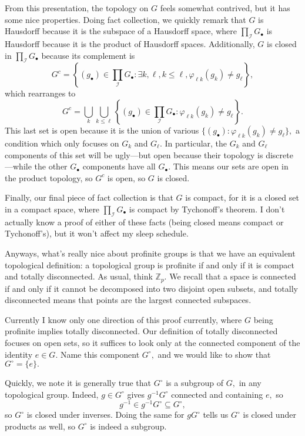 From this presentation, the topology on $G$ feels somewhat contrived, but it has some nice properties. Doing fact collection, we quickly remark that $G$ is Hausdorff because it is the subspace of a Hausdorff space, where $\prod_\mathcal IG_\bullet$ is Hausdorff because it is the product of Hausdorff spaces. Additionally, $G$ is closed in $\prod_\mathcal IG_\bullet$ because its complement is
\[G^c=\left\{(g_\bullet)\in\prod_\mathcal IG_\bullet:\exists k,\ell,k\le\ell,\varphi_{\ell k}(g_k)\ne g_\ell\right\},\]
which rearranges to
\[G^c=\bigcup_k\bigcup_{k\le\ell}\left\{(g_\bullet)\in\prod_\mathcal IG_\bullet:\varphi_{\ell k}(g_k)\ne g_\ell\right\}.\]
This last set is open because it is the union of various $\{(g_\bullet):\varphi_{\ell k}(g_k)\ne g_\ell\},$ a condition which only focuses on $G_k$ and $G_\ell.$ In particular, the $G_k$ and $G_\ell$ components of this set will be ugly---but open because their topology is discrete---while the other $G_\bullet$ components have all $G_\bullet.$ This means our sets are open in the product topology, so $G^c$ is open, so $G$ is closed.

Finally, our final piece of fact collection is that $G$ is compact, for it is a closed set in a compact space, where $\prod_\mathcal IG_\bullet$ is compact by Tychonoff's theorem. I don't actually know a proof of either of these facts (being closed means compact or Tychonoff's), but it won't affect my sleep schedule.

Anyways, what's really nice about profinite groups is that we have an equivalent topological definition: a topological group is profinite if and only if it is compact and totally disconnected. As usual, think $\mathbb Z_p.$ We recall that a space is connected if and only if it cannot be decomposed into two disjoint open subsets, and totally disconnected means that points are the largest connected subspaces.

Currently I know only one direction of this proof currently, where $G$ being profinite implies totally disconnected. Our definition of totally disconnected focuses on open sets, so it suffices to look only at the connected component of the identity $e\in G.$ Name this component $G^\circ,$ and we would like to show that $G^\circ=\{e\}.$

Quickly, we note it is generally true that $G^\circ$ is a subgroup of $G,$ in any topological group. Indeed, $g\in G^\circ$ gives $g^{-1}G^\circ$ connected and containing $e,$ so
\[g^{-1}\in g^{-1}G^\circ\subseteq G^\circ,\]
so $G^\circ$ is closed under inverses. Doing the same for $gG^\circ$ tells us $G^\circ$ is closed under products as well, so $G^\circ$ is indeed a subgroup.

